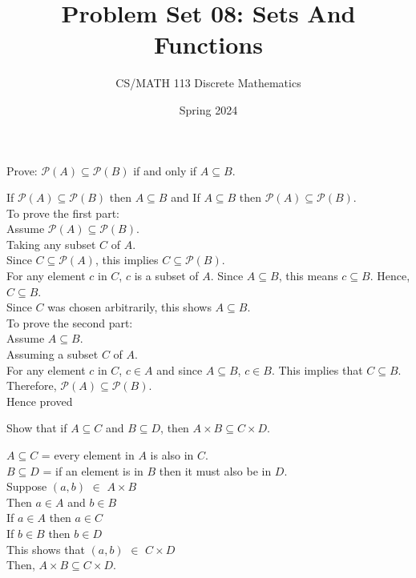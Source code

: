 \documentclass[a4paper]{exam}
\title{Problem Set 08: Sets And Functions}
\author{CS/MATH 113 Discrete Mathematics}
\date{Spring 2024}
\theoremstyle{definition}
\begin{document}
\maketitle

\begin{questions}
\question 
  Prove: $\mathcal{P}(A) \subseteq \mathcal{P}(B)$ if and only if $A \subseteq B$.

  \begin{solution}
  
  If $\mathcal{P}(A) \subseteq \mathcal{P}(B)$ then $A \subseteq B$ and  If $A \subseteq B$ then $\mathcal{P}(A) \subseteq \mathcal{P}(B)$.\\
To prove the first part:\\
Assume $\mathcal{P}(A) \subseteq \mathcal{P}(B)$.\\
Taking any subset $C$ of $A$.\\
Since $C \subseteq \mathcal{P}(A)$, this implies $C \subseteq \mathcal{P}(B)$.\\
For any element $c$ in $C$, $c$ is a subset of $A$. Since $A \subseteq B$, this means $c \subseteq B$. Hence, $C \subseteq B$.\\
Since $C$ was chosen arbitrarily, this shows $A \subseteq B$.\\
To prove the second part:\\
Assume $A \subseteq B$.\\
Assuming a subset $C$ of $A$.\\
For any element $c$ in $C$, $c \in A$ and since $A \subseteq B$, $c \in B$.
This implies that $C \subseteq B$.\\
Therefore, $\mathcal{P}(A) \subseteq \mathcal{P}(B)$.\\
Hence proved
  \end{solution}


\question Show that if \(A \subseteq C\) and \(B \subseteq D\), then \(A \times B \subseteq C \times D\).

  \begin{solution}
    
     \(A \subseteq C\) = every element in $A$ is also in $C$.\\
     \(B \subseteq D\) = if an element is in $B$ then it must also be in $D$.\\
     Suppose $(a,b)$ $\in$ \(A \times B \)\\
     Then $a \in A$ and $b \in B$\\
     If $a \in A$ then $a \in C$\\
      If $b \in B$ then $b \in D$\\
      This shows that $(a,b)$ $\in$ \(C \times D \)\\
      Then,  \(A \times B \subseteq C \times D\).
  \end{solution}
  

\end{questions}
\end{document}
